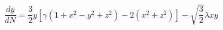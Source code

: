 \begin{equation}\label{auto2}
\frac{dy}{dN}=\frac{3}{2}y[\gamma(1+x^2-y^2+z^2)-2(x^2+z^2)]-\sqrt{\frac{3}{2}}\lambda
xy
\end{equation}


